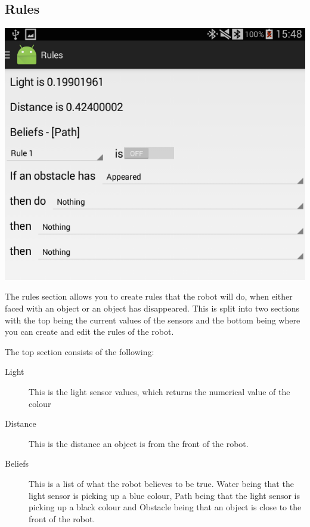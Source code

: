 \documentclass[]{article}   	%
\begin{document}
{\subsection{Rules}
\par{
\begin{center}
	\includegraphics[scale=0.45]{rules.png}
\end{center}			
}
\par{The rules section allows you to create rules that the robot will do, when either faced with an object or an object has disappeared. This is split into two sections with the top being the current values of the sensors and the bottom being where you can create and edit the rules of the robot.}
\par{The top section consists of the following:
\begin{description}
\item[Light]This is the light sensor values, which returns the numerical value of the colour
\item[Distance]This is the distance an object is from the front of the robot.
\item[Beliefs]This is a list of what the robot believes to be true. Water being that the light sensor is picking up a blue colour, Path being that the light sensor is picking up a black colour and Obstacle being that an object is close to the front of the robot.
\end{description}
}

}
\end{document}
